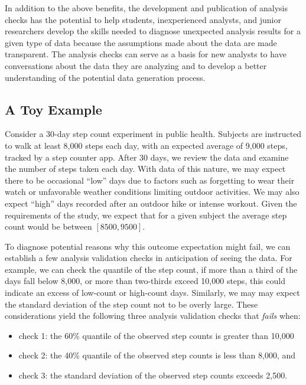 \documentclass[
  12pt,
]{interact}
\providecommand{\tightlist}{%
  \setlength{\itemsep}{0pt}\setlength{\parskip}{0pt}}\usepackage{longtable,booktabs,array}
\begin{document}
In addition to the above benefits, the development and publication of
analysis checks has the potential to help students, inexperienced
analysts, and junior researchers develop the skills needed to diagnose
unexpected analysis results for a given type of data because the
assumptions made about the data are made transparent. The analysis
checks can serve as a basis for new analysts to have conversations about
the data they are analyzing and to develop a better understanding of the
potential data generation process.

\subsection{A Toy Example}\label{sec-toy}

Consider a 30-day step count experiment in public health. Subjects are
instructed to walk at least 8,000 steps each day, with an expected
average of 9,000 steps, tracked by a step counter app. After 30 days, we
review the data and examine the number of steps taken each day. With
data of this nature, we may expect there to be occasional ``low'' days
due to factors such as forgetting to wear their watch or unfavorable
weather conditions limiting outdoor activities. We may also expect
``high'' days recorded after an outdoor hike or intense workout. Given
the requirements of the study, we expect that for a given subject the
average step count would be between \([8500, 9500]\).

To diagnose potential reasons why this outcome expectation might fail,
we can establish a few analysis validation checks in anticipation of
seeing the data. For example, we can check the quantile of the step
count, if more than a third of the days fall below 8,000, or more than
two-thirds exceed 10,000 steps, this could indicate an excess of
low-count or high-count days. Similarly, we may may expect the standard
deviation of the step count not to be overly large. These considerations
yield the following three analysis validation checks that \emph{fails}
when:

\begin{itemize}
\tightlist
\item
  check 1: the 60\% quantile of the observed step counts is greater than
  10,000
\item
  check 2: the 40\% quantile of the observed step counts is less than
  8,000, and
\item
  check 3: the standard deviation of the observed step counts exceeds
  2,500.
\end{itemize}
\end{document}
